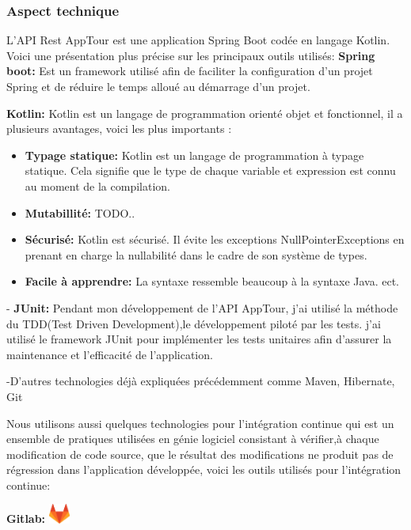 \documentclass[12pt]{article}
\begin{document}
\subsubsection{Aspect technique}

L'API Rest AppTour est une application Spring Boot codée en langage Kotlin. Voici une présentation plus précise sur les principaux  
outils utilisés: 
\textbf{Spring boot:} Est un framework utilisé afin de faciliter la configuration d'un projet Spring et de réduire le temps alloué au démarrage d'un projet.

\textbf{Kotlin:} Kotlin est un langage de programmation orienté objet et fonctionnel, il a plusieurs avantages, voici les plus importants :
\begin{itemize}
\item \textbf{Typage statique: } Kotlin est un langage de programmation à typage statique. Cela signifie que le type de chaque variable et expression est connu au moment de la compilation.
\item \textbf{Mutabillité: } TODO..
\item \textbf{Sécurisé: } Kotlin est sécurisé. Il évite les exceptions NullPointerExceptions en prenant en charge la nullabilité dans le cadre de son système de types.
\item \textbf{Facile à apprendre: } La syntaxe ressemble beaucoup à la syntaxe Java.
ect.
\end{itemize} 

- \textbf{JUnit:} Pendant mon développement de l'API AppTour, j'ai utilisé la méthode du TDD(Test Driven Development),le développement piloté par les tests. j'ai utilisé le framework JUnit pour implémenter les tests unitaires afin d'assurer la maintenance et l'efficacité de l’application.

-D'autres technologies déjà expliquées précédemment comme Maven, Hibernate, Git

Nous utilisons aussi quelques technologies pour l'intégration continue qui est un ensemble de pratiques utilisées en génie logiciel consistant à vérifier,à chaque modification de code source, que le résultat des modifications ne produit pas de régression dans l’application développée, voici les outils utilisés pour l'intégration continue: 

\textbf{Gitlab:} \includegraphics[width=7mm,scale=0.5]{diagrammes/gitlab.png}
\end{document}
